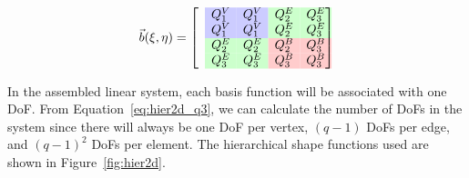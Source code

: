 \documentclass[11pt]{style/memo}
\begin{document}
\begin{equation}
    \label{eq:hier2d_q3}
    \vec{b}(\xi,\eta) = \begin{bmatrix}
        & \cellcolor{blue!20!white}  Q_1^V & \cellcolor{blue!20!white}  Q_1^V & \cellcolor{green!20!white} Q_2^E & \cellcolor{green!20!white} Q_3^E \\
        & \cellcolor{blue!20!white}  Q_1^V & \cellcolor{blue!20!white}  Q_1^V & \cellcolor{green!20!white} Q_2^E & \cellcolor{green!20!white} Q_3^E \\
        & \cellcolor{green!20!white} Q_2^E & \cellcolor{green!20!white} Q_2^E & \cellcolor{red!20!white}   Q_2^B & \cellcolor{red!20!white}   Q_3^B \\
        & \cellcolor{green!20!white} Q_3^E & \cellcolor{green!20!white} Q_3^E & \cellcolor{red!20!white}   Q_3^B & \cellcolor{red!20!white}   Q_3^B
    \end{bmatrix}
\end{equation}

In the assembled linear system, each basis function will be associated with one DoF.
From Equation~\ref{eq:hier2d_q3}, we can calculate the number of DoFs in the system since
there will always be one DoF per vertex, $(q-1)$ DoFs per edge, and $(q-1)^2$ DoFs
per element. The hierarchical shape functions used are shown in Figure~\ref{fig:hier2d}.
\end{document}
